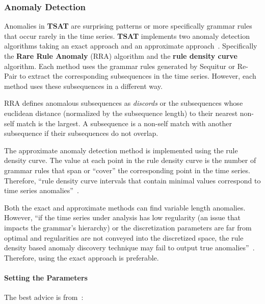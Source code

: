 \documentclass[titlepage, letterpaper, 12pt]{article}
\newcommand\TSAT{\textbf{TSAT}}
\begin{document}
\subsubsection{Anomaly Detection}
\label{anomalybackground}




Anomalies in {\TSAT} are surprising patterns or more specifically grammar rules that occur rarely in the time series.   {\TSAT} implements two anomaly detection algorithms taking an exact approach and an approximate approach~\cite{senin2015time}.  Specifically the \textbf{Rare Rule Anomaly} (RRA) algorithm and the \textbf{rule density curve} algorithm.  Each method uses the grammar rules generated by Sequitur or Re-Pair to extract the corresponding subsequences in the time series.  However, each method uses these subsequences in a different way.

RRA defines anomalous subsequences as \textit{discords} or the subsequences whose euclidean distance (normalized by the subsequence length) to their nearest non-self match is the largest.  A subsequence is a non-self match with another subsequence if their subsequences do not overlap. 

The approximate anomaly detection method is implemented using the rule density curve.  The value at each point in the rule density curve is the number of grammar rules that span or ``cover'' the corresponding point in the time series.  Therefore, ``rule density curve intervals that contain minimal values correspond to time series anomalies''~\cite{senin2015time}.  

Both the exact and approximate methods can find variable length anomalies.  However, ``if the time series under analysis has low regularity (an issue that impacts the grammar’s hierarchy) or the discretization parameters are far from optimal and regularities are not conveyed into the discretized space, the rule density based anomaly discovery technique may fail to output true anomalies''~\cite{senin2015time}.  Therefore, using the exact approach is preferable.
\paragraph{Setting the Parameters} The best advice is from~\cite{senin2015time}:
\end{document}
